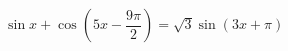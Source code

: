 \begin{ex}[type=equation]
	\begin{condition}
		$\ \sin x+\cos {\left(5x -\dfrac{9\pi}{2}\right)} = \sqrt{3}\sin {(3x + \pi)}$
	\end{condition}
\end{ex}